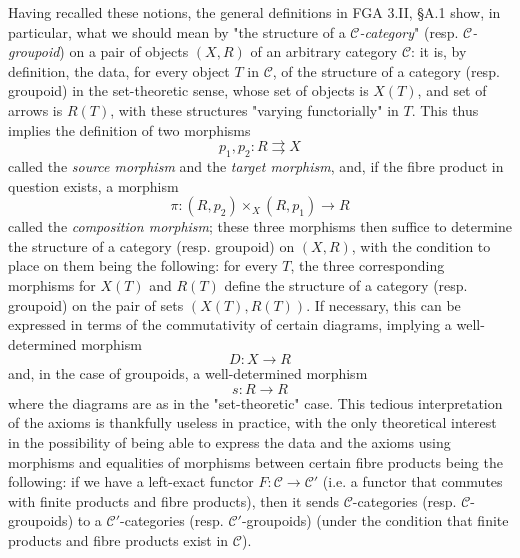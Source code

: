 Having recalled these notions, the general definitions in FGA 3.II, §A.1  show, in particular, what we should mean by "the structure of a \emph{$\mathcal{C}$-category}" (resp. \emph{$\mathcal{C}$-groupoid}) on a pair of objects $(X,R)$ of an arbitrary category $\mathcal{C}$:
it is, by definition, the data, for every object $T$ in $\mathcal{C}$, of the structure of a category (resp. groupoid) in the set-theoretic sense, whose set of objects is $X(T)$, and set of arrows is $R(T)$, with these structures "varying functorially" in $T$.
This thus implies the definition of two morphisms
\[
    p_1,p_2\colon R\rightrightarrows X
\]
called the \emph{source morphism} and the \emph{target morphism}, and, if the fibre product in question exists, a morphism
\[
    \pi\colon (R,p_2)\times_X(R,p_1) \to R
\]
called the \emph{composition morphism};
these three morphisms then suffice to determine the structure of a category (resp. groupoid) on $(X,R)$, with the condition to place on them being the following: for every $T$, the three corresponding morphisms for $X(T)$ and $R(T)$ define the structure of a category (resp. groupoid) on the pair of sets $(X(T),R(T))$.
If necessary, this can be expressed in terms of the commutativity of certain diagrams, implying a well-determined morphism
\[
    D\colon X\to R
\]
and, in the case of groupoids, a well-determined morphism
\[
    s\colon R\to R
\]
where the diagrams are as in the "set-theoretic" case.
This tedious interpretation of the axioms is thankfully useless in practice, with the only theoretical interest in the possibility of being able to express the data and the axioms using morphisms and equalities of morphisms between certain fibre products being the following: if we have a left-exact functor $F\colon\mathcal{C}\to\mathcal{C}'$ (i.e. a functor that commutes with finite products and fibre products), then it sends $\mathcal{C}$-categories (resp. $\mathcal{C}$-groupoids) to a $\mathcal{C}'$-categories (resp. $\mathcal{C}'$-groupoids) (under the condition that finite products and fibre products exist in $\mathcal{C}$).

